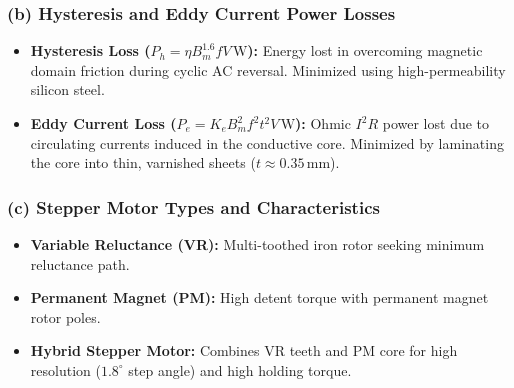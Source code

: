 \documentclass[11pt,a4paper,oneside]{article}
\begin{document}
\subsubsection*{(b) Hysteresis and Eddy Current Power Losses}
\begin{itemize}[leftmargin=1.5em]
  \item \textbf{Hysteresis Loss ($P_h = \eta B_m^{1.6} f V\,\mathrm{W}$):} Energy lost in overcoming magnetic domain friction during cyclic AC reversal. Minimized using high-permeability silicon steel.
  \item \textbf{Eddy Current Loss ($P_e = K_e B_m^2 f^2 t^2 V\,\mathrm{W}$):} Ohmic $I^2R$ power lost due to circulating currents induced in the conductive core. Minimized by laminating the core into thin, varnished sheets ($t \approx 0.35\,\mathrm{mm}$).
\end{itemize}

\subsubsection*{(c) Stepper Motor Types and Characteristics}
\begin{itemize}[leftmargin=1.5em]
  \item \textbf{Variable Reluctance (VR):} Multi-toothed iron rotor seeking minimum reluctance path.
  \item \textbf{Permanent Magnet (PM):} High detent torque with permanent magnet rotor poles.
  \item \textbf{Hybrid Stepper Motor:} Combines VR teeth and PM core for high resolution ($1.8^\circ$ step angle) and high holding torque.
\end{itemize}
\end{document}
